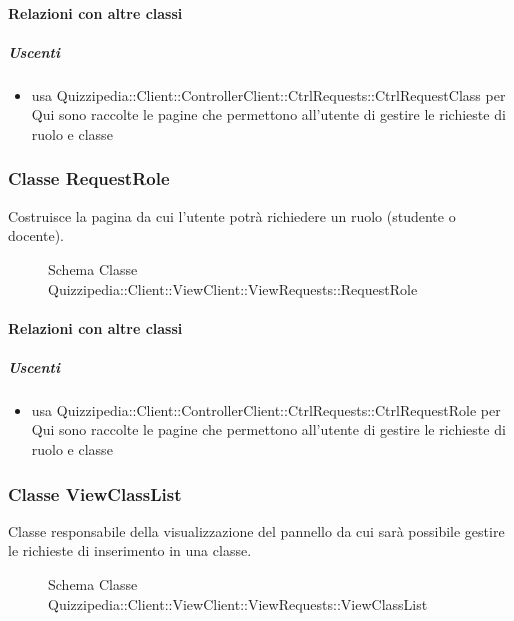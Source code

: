 \paragraph{Relazioni con altre classi}
\subparagraph{Uscenti}
\begin{itemize}
\item usa Quizzipedia::Client::ControllerClient::CtrlRequests::CtrlRequestClass per Qui sono raccolte le pagine che permettono all'utente di gestire le richieste di ruolo e classe
\end{itemize}
\subsubsection{Classe RequestRole}
Costruisce la pagina da cui l'utente potrà richiedere un ruolo (studente o docente).
\begin{figure}[H]
\centering
\noindent{}
\caption[Schema Classe RequestRole]{Schema Classe Quizzipedia::Client::ViewClient::ViewRequests::RequestRole}
\end{figure}
\paragraph{Relazioni con altre classi}
\subparagraph{Uscenti}
\begin{itemize}
\item usa Quizzipedia::Client::ControllerClient::CtrlRequests::CtrlRequestRole per Qui sono raccolte le pagine che permettono all'utente di gestire le richieste di ruolo e classe
\end{itemize}
\subsubsection{Classe ViewClassList}
Classe responsabile della visualizzazione del pannello da cui sarà possibile gestire le richieste di inserimento in una classe.
\begin{figure}[H]
\centering
\noindent{}
\caption[Schema Classe ViewClassList]{Schema Classe Quizzipedia::Client::ViewClient::ViewRequests::ViewClassList}
\end{figure}

